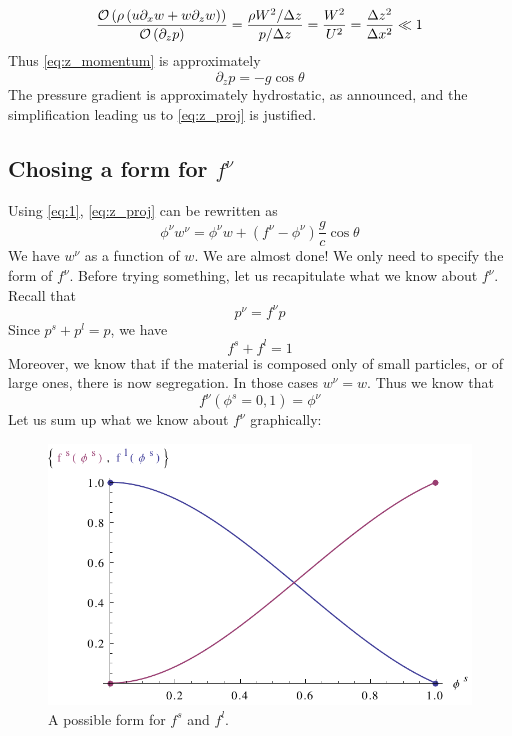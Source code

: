 \begin{equation}
	\frac{ \mathcal{O} \left( { \rho \left( u \partial_x w + w \partial_z w \right) } \right) }{ \mathcal{O} \left( {\partial_z p} \right) } = \frac{ \rho W^2/\Delta z}{p/\Delta z} = \frac{W^2}{U^2} = \frac{\Delta z^2}{\Delta x^2} \ll 1
\end{equation}
Thus \ref{eq:z_momentum} is approximately
\begin{equation} \label{eq:pressure_grad}
	\partial_z p = - g \cos \theta
\end{equation}
The pressure gradient is approximately hydrostatic, as announced, and the simplification leading us to \ref{eq:z_proj} is justified.

\subsection{Chosing a form for $f^\nu$}

Using \ref{eq:1},  \ref{eq:z_proj} can be rewritten as
\begin{equation} \label{eq:w}
	\phi^\nu w^\nu = \phi^\nu w + (f^\nu - \phi^\nu) \frac{g}{c} \cos \theta
\end{equation}
We have $w^\nu$ as a function of $w$. We are almost done! We only need to specify the form of $f^\nu$.
Before trying something, let us recapitulate what we know about $f^\nu$. 
Recall that 
\begin{equation}
	p^\nu = f^\nu p
\end{equation}
Since $p^s + p ^l = p$, we have
\begin{equation}
	f^s + f^l = 1
\end{equation}
Moreover, we know that if the material is composed only of small particles, or of large ones, there is now segregation. In those cases $w^\nu = w$. Thus we know that
\begin{equation}
f^\nu(\phi^s = 0, 1) = \phi^\nu
\end{equation}
Let us sum up what we know about $f^\nu$ graphically:
\begin{figure}[htp] \label{fig:1}
\centering
\includegraphics[scale=0.9]{appendix/f_form.pdf}
\caption{A possible form for $f^s$ and  $f^l$.}
\label{}
\end{figure}

